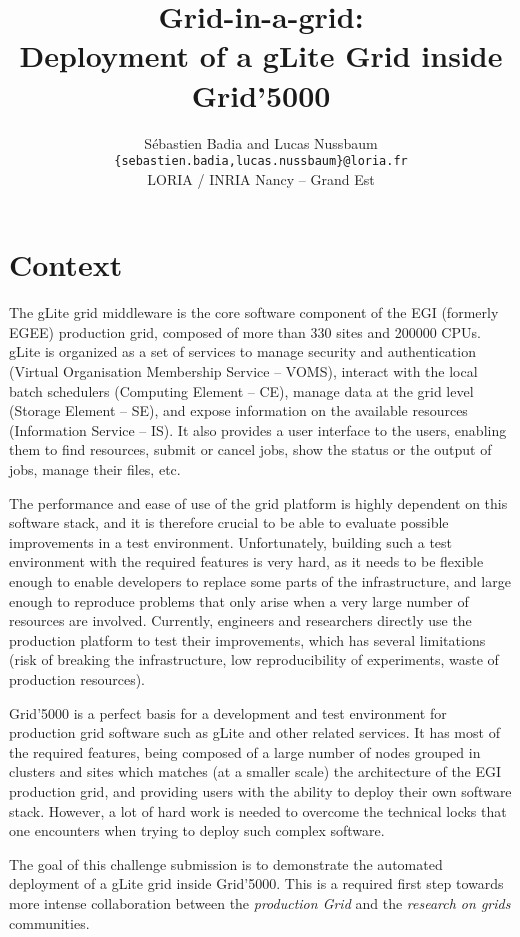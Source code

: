 \documentclass[a4paper, 11pt]{article}
\title{Grid-in-a-grid:\\ Deployment of a gLite Grid inside Grid'5000}
\author{Sébastien Badia and Lucas Nussbaum\\\texttt{\small \{sebastien.badia,lucas.nussbaum\}@loria.fr}\\[0.5em]LORIA / INRIA Nancy -- Grand Est}
\date{}
\begin{document}
\maketitle
\section{Context}

The gLite grid middleware is the core software component of the EGI (formerly
EGEE) production grid, composed of more than 330 sites and 200000 CPUs.  gLite
is organized as a set of services to manage security and authentication
(Virtual Organisation Membership Service -- VOMS), interact with the local
batch schedulers (Computing Element -- CE), manage data at the grid level
(Storage Element -- SE), and expose information on the available resources
(Information Service -- IS). It also provides a user interface to the users,
enabling them to find resources, submit or cancel jobs, show the status or the
output of jobs, manage their files, etc.

The performance and ease of use of the grid platform is highly dependent on
this software stack, and it is therefore crucial to be able to evaluate
possible improvements in a test environment. Unfortunately, building such a
test environment with the required features is very hard, as it needs to be
flexible enough to enable developers to replace some parts of the
infrastructure, and large enough to reproduce problems that only arise when a
very large number of resources are involved.  Currently, engineers and
researchers directly use the production platform to test their improvements,
which has several limitations (risk of breaking the infrastructure, low
reproducibility of experiments, waste of production resources).

Grid'5000 is a perfect basis for a development and test environment for
production grid software such as gLite and other related services. It has most
of the required features, being composed of a large number of nodes grouped in
clusters and sites which matches (at a smaller scale) the architecture of the
EGI production grid, and providing users with the ability to deploy their own
software stack. However, a lot of hard work is needed to overcome the technical
locks that one encounters when trying to deploy such complex software.

The goal of this challenge submission is to demonstrate the automated
deployment of a gLite grid inside Grid'5000. This is a required first step
towards more intense collaboration between the \textsl{production Grid} and the
\textsl{research on grids} communities.
\end{document}
